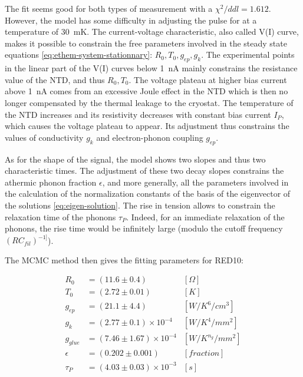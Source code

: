 The fit seems good for both types of measurement with a $\chi^2/ddl=1.612$. However, the model has some difficulty in adjusting the pulse for at a temperature of \SI{30}{\milli\kelvin}. The current-voltage characteristic, also called V(I) curve, makes it possible to constrain the free parameters involved in the steady state equations \ref{eq:ethem-system-stationnary}: $R_0, T_0, g_{ep}, g_k$. The experimental points in the linear part of the V(I) curves below \SI{1}{\nano\ampere} mainly constrains the resistance value of the NTD, and thus $R_0, T_0$. The voltage plateau at higher bias current above \SI{1}{\nano\ampere} comes from an excessive Joule effect in the NTD which is then no longer compensated by the thermal leakage to the cryostat. The temperature of the NTD increases and its resistivity decreases with constant bias current $I_P$, which causes the voltage plateau to appear. Its adjustment thus constrains the values of conductivity $g_k$ and electron-phonon coupling $g_{ep}$.

As for the shape of the signal, the model shows two slopes and thus two characteristic times. The adjustment of these two decay slopes constrains the athermic phonon fraction $\epsilon$, and more generally, all the parameters involved in the calculation of the normalization constants of the basis of the eigenvector of the solutions \ref{eq:eigen-solution}.
The rise in tension allows to constrain the relaxation time of the phonons $\tau_P$. Indeed, for an immediate relaxation of the phonons, the rise time would be infinitely large (modulo the cutoff frequency $(RC_{fil})^{-1]}$).

The MCMC method then gives the fitting parameters for RED10:

\begin{align}
R_0 &= (11.6 \pm 0.4)&[\Omega] \\
T_0 &= (2.72 \pm 0.01) &[K] \\
g_{ep} &= (21.1 \pm 4.4) &[W/K^6/cm^3] \\
g_k &= (2.77 \pm 0.1) \times 10^{-4}&[W/K^4/mm^2] \\
g_{glue} &= (7.46 \pm 1.67) \times 10^{-4} &[W/K^{n_g}/mm^2] \\
\epsilon &= (0.202 \pm 0.001)  & [fraction]\\
\tau_P &= (4.03 \pm 0.03) \times 10^{-3} &[s]
\end{align}

